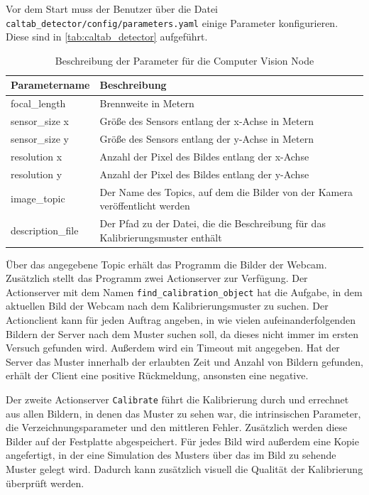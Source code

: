 Vor dem Start muss der Benutzer über die Datei \texttt{caltab\_detector/config/parameters.yaml} einige Parameter konfigurieren. Diese sind in \autoref{tab:caltab_detector} aufgeführt.

\begin{table}
\begin{tabularx}{\textwidth}{|l|X|}
	\hline
	Parametername & Beschreibung \\\hline
	focal\_length & Brennweite in Metern \\\hline
	sensor\_size x & Größe des Sensors entlang der x-Achse in Metern \\\hline
	sensor\_size y & Größe des Sensors entlang der y-Achse in Metern \\\hline
	resolution x & Anzahl der Pixel des Bildes entlang der x-Achse \\\hline
	resolution y & Anzahl der Pixel des Bildes entlang der y-Achse \\\hline
	image\_topic & Der Name des Topics, auf dem die Bilder von der Kamera veröffentlicht werden \\\hline
	description\_file & Der Pfad zu der Datei, die die Beschreibung für das Kalibrierungsmuster enthält \\\hline
\end{tabularx}
\caption{Beschreibung der Parameter für die Computer Vision Node}
\label{tab:caltab_detector}
\end{table}

Über das angegebene Topic erhält das Programm die Bilder der Webcam. Zusätzlich stellt das Programm zwei Actionserver zur Verfügung. Der Actionserver mit dem Namen \texttt{find\_calibration\_object} hat die Aufgabe, in dem aktuellen Bild der Webcam nach dem Kalibrierungsmuster zu suchen. Der Actionclient kann für jeden Auftrag angeben, in wie vielen aufeinanderfolgenden Bildern der Server nach dem Muster suchen soll, da dieses nicht immer im ersten Versuch gefunden wird. Außerdem wird ein Timeout mit angegeben. Hat der Server das Muster innerhalb der erlaubten Zeit und Anzahl von Bildern gefunden, erhält der Client eine positive Rückmeldung, ansonsten eine negative.

Der zweite Actionserver \texttt{Calibrate} führt die Kalibrierung durch und errechnet aus allen Bildern, in denen das Muster zu sehen war, die intrinsischen Parameter, die Verzeichnungsparameter und den mittleren Fehler. Zusätzlich werden diese Bilder auf der Festplatte abgespeichert. Für jedes Bild wird außerdem eine Kopie angefertigt, in der eine Simulation des Musters über das im Bild zu sehende Muster gelegt wird. Dadurch kann zusätzlich visuell die Qualität der Kalibrierung überprüft werden.

